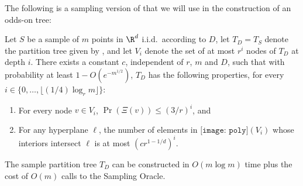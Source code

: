 \documentclass{patmorin}
\newcommand{\poly}{\texttt{[image: poly]}}
\begin{document}
The following is a sampling version of  that we
will use in the construction of an odds-on tree:

\begin{thm} 
  Let $S$ be a sample of $m$ points in $\R^d$ i.i.d.\ according
  to $D$, let $T_D=T_S$ denote the partition tree
  given by , and let $V_i$ denote the set
  of at most $r^i$ nodes of $T_D$ at depth $i$.  There exists a constant $c$,
  independent of $r$, $m$ and $D$, such that with probability at least
  $1-O(e^{-m^{1/2}})$, $T_D$ has the following properties, for every
  $i\in\{0,\ldots,\lfloor (1/4)\log_rm\rfloor\}$:
  \begin{enumerate}
    \item For every node $v\in V_i$, $\Pr(\Xi(v)) \le (3/r)^i$,
         and
    \item For any hyperplane $\ell$, the number of elements in
      $\poly(V_i)$ whose interiors intersect $\ell$ is at most
      $(cr^{1-1/d})^i$.
  \end{enumerate}
  The sample partition tree $T_D$ can be constructed in $O(m\log m)$
  time plus the cost of $O(m)$ calls to the Sampling Oracle.
\end{thm}

\def\isdef{\buildrel {\rm def} \over =}
\def\PROB{\Pr}
\end{document}
